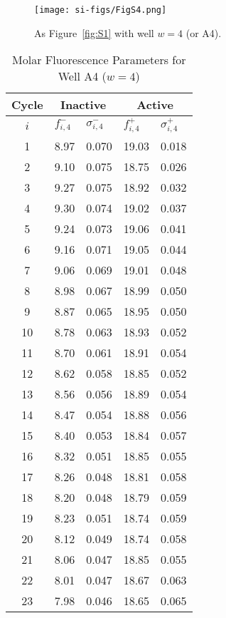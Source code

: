                 \begin{figure}
                    \centering
                    \texttt{[image: si-figs/FigS4.png]}
                    \caption{
                        As Figure~\ref{fig:S1} with well $w=4$ (or A4).
                    }
                \end{figure}
                \clearpage
    \begin{table}
        \caption{Molar Fluorescence Parameters for Well A4 ($w=4$)}
        \centering
        \begin{tabular}{c|ll|ll}
            Cycle & \multicolumn{2}{c|}{Inactive} & \multicolumn{2}{c}{Active} \\
            \hline
            $i$ & $f_{i,4}^{-}$ & $\sigma_{i,4}^{-}$ &  $f_{i,4}^{+}$ & $\sigma_{i,4}^{+}$ \\
            \hline
    1 & 8.97 & 0.070 & 19.03 & 0.018 \\
2 & 9.10 & 0.075 & 18.75 & 0.026 \\
3 & 9.27 & 0.075 & 18.92 & 0.032 \\
4 & 9.30 & 0.074 & 19.02 & 0.037 \\
5 & 9.24 & 0.073 & 19.06 & 0.041 \\
6 & 9.16 & 0.071 & 19.05 & 0.044 \\
7 & 9.06 & 0.069 & 19.01 & 0.048 \\
8 & 8.98 & 0.067 & 18.99 & 0.050 \\
9 & 8.87 & 0.065 & 18.95 & 0.050 \\
10 & 8.78 & 0.063 & 18.93 & 0.052 \\
11 & 8.70 & 0.061 & 18.91 & 0.054 \\
12 & 8.62 & 0.058 & 18.85 & 0.052 \\
13 & 8.56 & 0.056 & 18.89 & 0.054 \\
14 & 8.47 & 0.054 & 18.88 & 0.056 \\
15 & 8.40 & 0.053 & 18.84 & 0.057 \\
16 & 8.32 & 0.051 & 18.85 & 0.055 \\
17 & 8.26 & 0.048 & 18.81 & 0.058 \\
18 & 8.20 & 0.048 & 18.79 & 0.059 \\
19 & 8.23 & 0.051 & 18.74 & 0.059 \\
20 & 8.12 & 0.049 & 18.74 & 0.058 \\
21 & 8.06 & 0.047 & 18.85 & 0.055 \\
22 & 8.01 & 0.047 & 18.67 & 0.063 \\
23 & 7.98 & 0.046 & 18.65 & 0.065 \\

\end{tabular}
\end{table}
